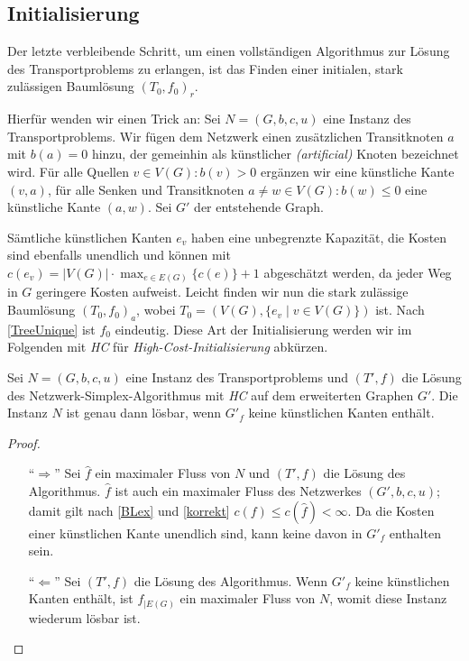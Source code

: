 \subsection{Initialisierung} \label{ch:init}
Der letzte verbleibende Schritt, um einen vollständigen Algorithmus zur Lösung des Transportproblems zu erlangen, ist das Finden einer initialen, stark zulässigen Baumlösung $(T_0,f_0)_r$.

Hierfür wenden wir einen Trick an: Sei $N=(G,b,c,u)$ eine Instanz des Transportproblems. Wir fügen dem Netzwerk einen zusätzlichen Transitknoten $a$ mit $b(a)=0$ hinzu, der gemeinhin als künstlicher \textit{(artificial)} Knoten bezeichnet wird. Für alle Quellen $v\in V(G)\colon b(v)>0$ ergänzen wir eine künstliche Kante $(v,a)$, für alle Senken und Transitknoten $a\neq w\in V(G)\colon b(w)\leq0$ eine künstliche Kante $(a,w)$. Sei $G'$ der entstehende Graph.

Sämtliche künstlichen Kanten $e_v$ haben eine unbegrenzte Kapazität, die Kosten sind ebenfalls unendlich und können mit $c(e_v)=|V(G)|\cdot\max_{e\in E(G)}\{c(e)\}+1$ abgeschätzt werden, da jeder Weg in $G$ geringere Kosten aufweist. Leicht finden wir nun die stark zulässige Baumlösung $(T_0,f_0)_a$, wobei $T_0=(V(G),\{e_v\mid v\in V(G)\})$ ist. Nach \cref{TreeUnique} ist $f_0$ eindeutig. Diese Art der Initialisierung werden wir im Folgenden mit \emph{HC} für \emph{High-Cost-Initialisierung} abkürzen.

\begin{lem}Sei $N=(G,b,c,u)$ eine Instanz des Transportproblems und $(T',f)$ die Lösung des Netzwerk-Simplex-Algorithmus mit \emph{HC} auf dem erweiterten Graphen $G'$. Die Instanz $N$ ist genau dann lösbar, wenn $G'_f$ keine künstlichen Kanten enthält.\end{lem}
\begin{proof}\label{solvable}\mbox{}
\begin{itemize}[topsep=0pt]
	\item[\enquote{$\Rightarrow$}] Sei $\hat{f}$ ein maximaler Fluss von $N$ und $(T',f)$ die Lösung des Algorithmus. $\hat{f}$ ist auch ein maximaler Fluss des Netzwerkes $(G',b,c,u)$; damit gilt nach \cref{BLex} und \cref{korrekt} $c(f)\leq c(\hat{f})<\infty$. Da die Kosten einer künstlichen Kante unendlich sind, kann keine davon in $G'_f$ enthalten sein.
	
	\item[\enquote{$\Leftarrow$}] Sei $(T',f)$ die Lösung des Algorithmus. Wenn $G'_f$ keine künstlichen Kanten enthält, ist $f_{|E(G)}$ ein maximaler Fluss von $N$, womit diese Instanz wiederum lösbar ist.\qedhere
\end{itemize}
\end{proof}

